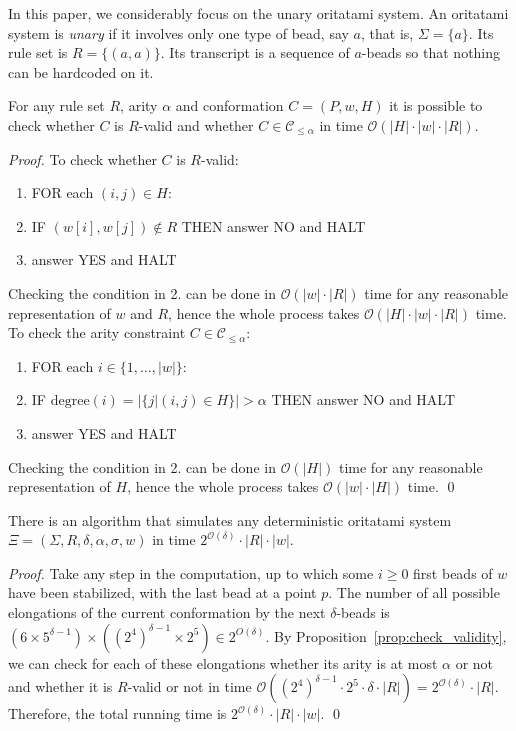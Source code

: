 \documentclass[runningheads]{llncs}
\begin{document}
In this paper, we considerably focus on the unary oritatami system. 
An oritatami system is \textit{unary} if it involves only one type of bead, say $a$, that is, $\Sigma = \{a\}$. 
Its rule set is $R = \{(a, a)\}$. 
Its transcript is a sequence of $a$-beads so that nothing can be hardcoded on it. 


\begin{proposition}\label{prop:check_validity}
	For any rule set $R$, arity $\alpha$ and conformation $C = (P,w,H)$ it is possible to check whether $C$ is $R$-valid and whether $C\in \mathcal{C}_{\leq \alpha}$ in time $\mathcal{O}(|H|\cdot|w|\cdot|R|)$.
\end{proposition}
\begin{proof}
	To check whether $C$ is $R$-valid:
	\begin{enumerate}
		\item FOR each $(i,j)\in H$:
		\item \hspace{1cm} IF $(w[i],w[j])\notin R$ THEN answer NO and HALT
		\item answer YES and HALT
	\end{enumerate}	
	Checking the condition in 2. can be done in $\mathcal{O}(|w|\cdot|R|)$ time for any reasonable representation of $w$ and $R$, hence the whole process takes $\mathcal{O}(|H|\cdot |w|\cdot|R|)$ time.	
	To check the arity constraint $C\in \mathcal{C}_{\leq \alpha}$: 
	\begin{enumerate}
		\item FOR each $i\in \{1,\dots,|w|\}$:
		\item \hspace{1cm} IF $\mathrm{degree}(i)=|\{j | (i,j)\in H \}|>\alpha$ THEN answer NO and HALT
		\item answer YES and HALT
	\end{enumerate}	
	Checking the condition in 2. can be done in $\mathcal{O}(|H|)$ time for any reasonable representation of $H$, hence the whole process takes $\mathcal{O}(|w|\cdot|H|)$ time.
	\qed
\end{proof}

\begin{theorem}\label{thm:OS_to_2dTM}
	There is an algorithm that simulates any deterministic oritatami system $\Xi = (\Sigma, R, \delta, \alpha, \sigma, w)$ in time $2^{\mathcal{O}(\delta)}\cdot |R|\cdot|w|$. 
\end{theorem}
\begin{proof}
	Take any step in the computation, up to which some $i \ge 0$ first beads of $w$ have been stabilized, with the last bead at a point $p$. 
	The number of all possible elongations of the current conformation by the next $\delta$-beads is $(6 \times 5^{\delta-1}) \times ((2^4)^{\delta-1} \times 2^5) \in 2^{O(\delta)}$. 
	By Proposition~\ref{prop:check_validity}, we can check for each of these elongations whether its arity is at most $\alpha$ or not and whether it is $R$-valid or not in time $\mathcal{O}((2^4)^{\delta-1}\cdot2^5\cdot \delta\cdot|R|)=2^{\mathcal{O}(\delta)}\cdot|R|$.  Therefore, the total running time is $2^{\mathcal{O}(\delta)}\cdot |R|\cdot|w|$.
	\qed
\end{proof}
\end{document}
